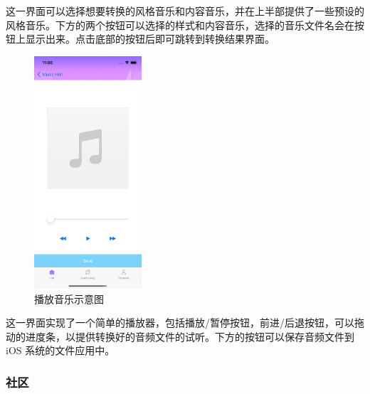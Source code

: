 这一界面可以选择想要转换的风格音乐和内容音乐，并在上半部提供了一些预设的风格音乐。下方的两个按钮可以选择的样式和内容音乐，选择的音乐文件名会在按钮上显示出来。点击底部的按钮后即可跳转到转换结果界面。



\begin{figure}
\includegraphics[width=4cm]{figures/音乐试听.png}
\caption{播放音乐示意图}
\label{fig:my_label}
\end{figure}

这一界面实现了一个简单的播放器，包括播放/暂停按钮，前进/后退按钮，可以拖动的进度条，以提供转换好的音频文件的试听。下方的按钮可以保存音频文件到 iOS 系统的文件应用中。

\subsubsection{社区}


